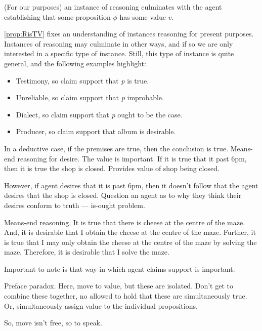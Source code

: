 \begin{note}
  \begin{proposition}\label{prop:RisTV}
    (For our purposes) an instance of reasoning culminates with the agent establishing that some proposition \(\phi\) has some value \(v\).
  \end{proposition}

  \autoref{prop:RisTV} fixes an understanding of instances reasoning for present purposes.
  Instances of reasoning may culminate in other ways, and if so we are only interested in a specific type of instance.
  Still, this type of instance is quite general, and the following examples highlight:

  \begin{itemize}
  \item Testimony, so claim support that \emph{p} is true.
  \item Unreliable, so claim support that \emph{p} improbable.
  \item Dialect, so claim support that \emph{p} ought to be the case.
  \item Producer, so claim support that album is desirable.
  \end{itemize}

  In a deductive case, if the premises are true, then the conclusion is true.
  Means-end reasoning for desire.
  The value is important.
  If it is true that it past 6pm, then it is true the shop is closed.
  Provides value of shop being closed.

  However, if agent desires that it is past 6pm, then it doesn't follow that the agent desires that the shop is closed.
  Question an agent as to why they think their desires conform to truth --- is-ought problem.

  Means-end reasoning.
  It is true that there is cheese at the centre of the maze.
  And, it is desirable that I obtain the cheese at the centre of the maze.
  Further, it is true that I may only obtain the cheese at the centre of the maze by solving the maze.
  Therefore, it is desirable that I solve the maze.
\end{note}

\begin{note}
  \color{red}
  Important to note is that way in which agent claims support is important.

  Preface paradox.
  Here, move to value, but these are isolated.
  Don't get to combine these together, no allowed to hold that these are simultaneously true.
  Or, simultaneously assign value to the individual propositions.

  So, move isn't free, so to speak.
\end{note}

